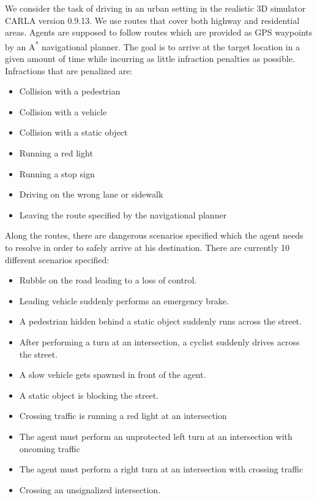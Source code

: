 \documentclass[letterpaper, 12pt]{article}
\theoremstyle{definition}
\theoremstyle{definition}
\theoremstyle{definition}
\theoremstyle{definition}
\theoremstyle{definition}
\begin{document}
We consider the task of driving in an urban setting in the realistic 3D simulator
CARLA version 0.9.13. We use routes that cover both highway and residential
areas. Agents are supposed to follow routes which are provided as GPS waypoints
by an A\textsuperscript{*} navigational planner. The goal is to arrive at the target location in a given
amount of time while incurring as little infraction penalties as possible. Infractions
that are penalized are:
\begin{itemize}
\item Collision with a pedestrian
\item Collision with a vehicle
\item Collision with a static object
\item Running a red light
\item Running a stop sign
\item Driving on the wrong lane or sidewalk
\item Leaving the route specified by the navigational planner
\end{itemize}
Along the routes, there are dangerous scenarios specified which the agent needs to
resolve in order to safely arrive at his destination. There are currently 10 different
scenarios specified:
\begin{itemize}
\item Rubble on the road leading to a loss of control.
\item Leading vehicle suddenly performs an emergency brake.
\item A pedestrian hidden behind a static object suddenly runs across the street.
\item After performing a turn at an intersection, a cyclist suddenly drives across
the street.
\item A slow vehicle gets spawned in front of the agent.
\item A static object is blocking the street.
\item Crossing traffic is running a red light at an intersection
\item The agent must perform an unprotected left turn at an intersection with oncoming traffic
\item The agent must perform a right turn at an intersection with crossing traffic
\item Crossing an unsignalized intersection.
\end{itemize}
\end{document}
